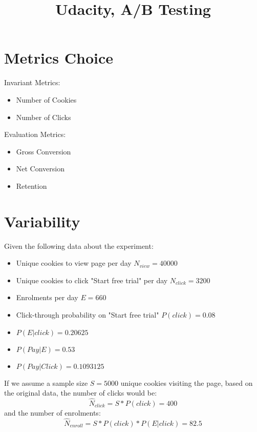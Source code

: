 \documentclass[12pt,a4paper]{article}
\begin{document}
\title{Udacity, A/B Testing}

\maketitle

\section{Metrics Choice}

Invariant Metrics:

\begin{itemize}
\item Number of Cookies
\item Number of Clicks
\end{itemize}

Evaluation Metrics:

\begin{itemize}
\item Gross Conversion
\item Net Conversion
\item Retention
\end{itemize}

\section{Variability}
Given the following data about the experiment:
\begin{itemize}
\item Unique cookies to view page per day $N_{view} = 40000$
\item Unique cookies to click "Start free trial" per day $N_{click} = 3200$
\item Enrolments per day $E = 660$
\item Click-through probability on "Start free trial" $P(click) = 0.08$
\item $P(E|click) = 0.20625$
\item $P(Pay|E) = 0.53$
\item $P(Pay|Click) = 0.1093125$
\end{itemize}

If we assume a sample size $S = 5000$ unique cookies visiting the page, based on
the original data, the number of clicks would be:
\begin{equation}
\hat{N}_{click} = S * P(click) = 400
\end{equation}
and the number of enrolments:
\begin{equation}
\hat{N}_{enroll} = S * P(click) * P(E|click) = 82.5
\end{equation}
\end{document}
